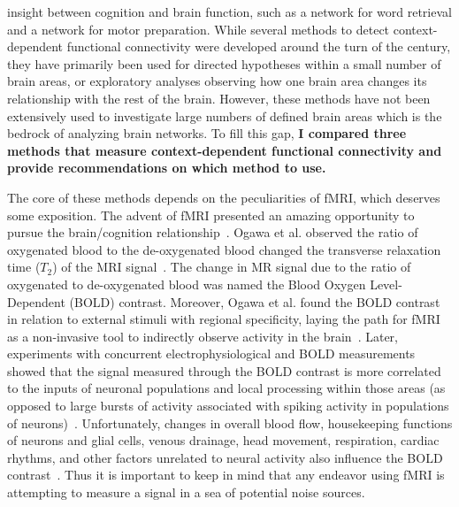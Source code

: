 \documentclass[phd,figures,tables,ackpage,abstractpage,publicabstractpage]{uithesis}
\begin{document}
insight between cognition and brain function, such as a network for word retrieval and
a network for motor preparation.
While several methods to detect context-dependent functional connectivity
were developed around the turn of the century, they have primarily
been used for directed hypotheses within a small number of brain areas, or
exploratory analyses observing how one brain area changes its relationship
with the rest of the brain.
However, these methods have not been extensively used to investigate large numbers of defined
brain areas which is the bedrock of analyzing brain networks.
To fill this gap, \textbf{I compared three methods that measure context-dependent functional connectivity
and provide recommendations on which method to use.}

The core of these methods depends on the peculiarities of fMRI, which deserves some exposition.
The advent of fMRI presented an amazing opportunity
to pursue the brain/cognition relationship~\cite{ogawa1990,Ogawa1992}.
Ogawa et al. observed the ratio of oxygenated blood to the de-oxygenated blood changed the transverse
relaxation time ($T_2$) of the MRI signal~\cite{ogawa1990}.
The change in MR signal due to the ratio of oxygenated to de-oxygenated blood was named the
Blood Oxygen Level-Dependent (BOLD) contrast. 
Moreover, Ogawa et al. found the BOLD contrast in
relation to external stimuli with regional specificity, laying the path for fMRI as a non-invasive tool
to indirectly observe activity in the brain~\cite{Ogawa1992}.
Later, experiments with concurrent electrophysiological and BOLD measurements showed that 
the signal measured through the BOLD contrast is more correlated to the inputs of
neuronal populations and local processing within those areas (as opposed to large bursts of activity
associated with spiking activity in populations of neurons)~\cite{Logothetis2001}.
Unfortunately, changes in overall blood flow, housekeeping functions of neurons and glial cells,
venous drainage, head movement, respiration, cardiac rhythms, and other factors unrelated
to neural activity also influence the BOLD contrast~\cite{Attwell2002,Kim2012,Liu2016}.
Thus it is important to keep in mind that any endeavor using fMRI is attempting to measure
a signal in a sea of potential noise sources.
\end{document}
